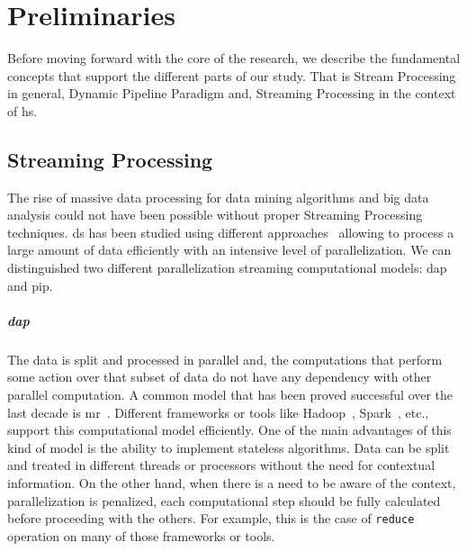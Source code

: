 \chapter{Preliminaries}\label{prelim}
Before moving forward with the core of the research, we describe the fundamental concepts that support the different parts of our study. That is Stream Processing in general, Dynamic Pipeline Paradigm and, Streaming Processing in the context of \acrshort{hs}.

\section{Streaming Processing}
The rise of massive data processing for data mining algorithms and big data analysis could not have been possible without proper Streaming Processing techniques. 
\acrfull{ds} has been studied using different approaches~\cite{enumeratingsg, exploiting, onthefly} allowing to process a large amount of data efficiently with an intensive level of parallelization.
We can distinguished two different parallelization streaming computational models: \acrfull{dap} and \acrfull{pip}. 

\paragraph{\acrfull{dap}} The data is split and processed in parallel and, the computations that perform some action over that subset of data do not have any dependency with other parallel computation. 
A common model that has been proved successful over the last decade is \acrfull{mr}~\cite{mapreduce}. Different frameworks or tools like Hadoop~\cite{hadoop}, Spark~\cite{apachespark}, etc., support this computational model efficiently. 
One of the main advantages of this kind of model is the ability to implement stateless algorithms. Data can be split and treated in different threads or processors without the need for contextual information. 
On the other hand, when there is a need to be aware of the context, parallelization is penalized, each computational step should be fully calculated before proceeding with the others. 
For example, this is the case of \texttt{reduce} operation on many of those frameworks or tools.

